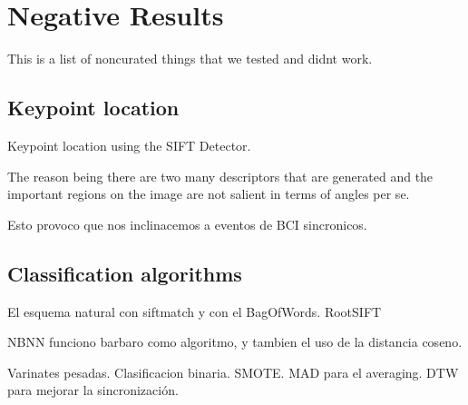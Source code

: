 \chapter{Negative Results}

This is a list of noncurated things that we tested and didnt work.

\section{Keypoint location}

Keypoint location using the SIFT Detector.

The reason being there are two many descriptors that are generated and the important regions on the image are not salient in terms of angles per se.

Esto provoco que nos inclinacemos a eventos de BCI sincronicos.


\section{Classification algorithms}

El esquema natural con siftmatch y con el BagOfWords.
RootSIFT

NBNN funciono barbaro como algoritmo, y tambien el uso de la distancia coseno.

Varinates pesadas.  Clasificacion binaria.  SMOTE.   MAD para el averaging.   DTW para mejorar la sincronización.



